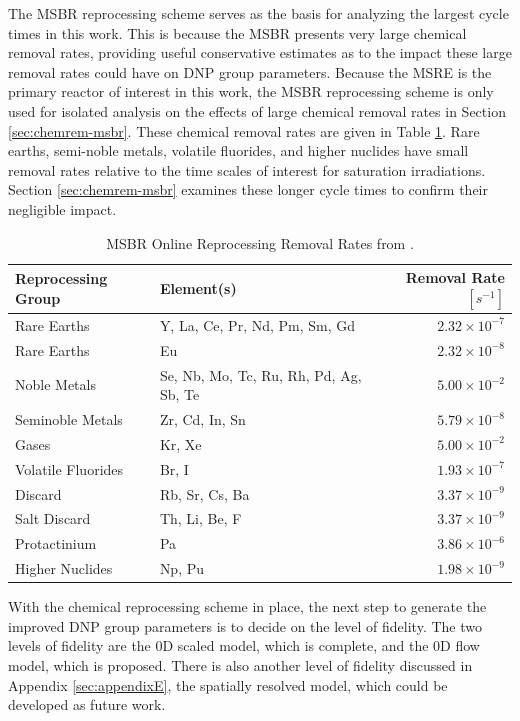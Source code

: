 The \gls{MSBR} reprocessing scheme serves as the basis for analyzing the largest cycle times in this work.
This is because the \gls{MSBR} presents very large chemical removal rates, providing useful conservative estimates as to the impact these large removal rates could have on \gls{DNP} group parameters.
Because the \gls{MSRE} is the primary reactor of interest in this work, the \gls{MSBR} reprocessing scheme is only used for isolated analysis on the effects of large chemical removal rates in Section \ref{sec:chemrem-msbr}.
These chemical removal rates are given in Table \ref{tab:msbr_cycle_times}.
Rare earths, semi-noble metals, volatile fluorides, and higher nuclides have small removal rates relative to the time scales of interest for saturation irradiations.
Section \ref{sec:chemrem-msbr} examines these longer cycle times to confirm their negligible impact.

\begin{table}[H]
\renewcommand{\arraystretch}{1.25}
\caption{MSBR Online Reprocessing Removal Rates from \cite{robertson_conceptual_1971}.}
\label{tab:msbr_cycle_times}
\begin{center}
\begin{tabular}{ l p{} r}
 \hline
 Reprocessing Group & Element(s) & Removal Rate $[s^{-1}]$\\
 \hline
 Rare Earths & Y, La, Ce, Pr, Nd, Pm, Sm, Gd & $2.32 \times 10^{-7}$\\
 Rare Earths & Eu & $2.32 \times 10^{-8}$\\
 Noble Metals  & Se, Nb, Mo, Tc, Ru, Rh, Pd, Ag, Sb, Te & $5.00 \times 10^{-2}$\\
 Seminoble Metals & Zr, Cd, In, Sn &  $5.79 \times 10^{-8}$\\
 Gases & Kr, Xe & $5.00 \times 10^{-2}$\\
 Volatile Fluorides & Br, I & $1.93 \times 10^{-7}$\\
 Discard & Rb, Sr, Cs, Ba & $3.37 \times 10^{-9}$\\
 Salt Discard & Th, Li, Be, F & $3.37 \times 10^{-9}$\\
 Protactinium & Pa & $3.86 \times 10^{-6}$\\
 Higher Nuclides & Np, Pu & $1.98 \times 10^{-9}$\\
 \hline
\end{tabular}
\end{center}
\end{table}

With the chemical reprocessing scheme in place, the next step to generate the improved \gls{DNP} group parameters is to decide on the level of fidelity. 
The two levels of fidelity are the 0D scaled model, which is complete, and the 0D flow model, which is proposed.
There is also another level of fidelity discussed in Appendix \ref{sec:appendixE}, the spatially resolved model, which could be developed as future work.

